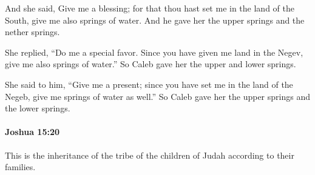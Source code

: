 			\begin{versebox}
					\item[BHS] 
					\item[ASV] And she said, Give me a blessing; for that thou hast set me in the land of the South, give me also springs of water. And he gave her the upper springs and the nether springs.
					\item[NIV] She replied, “Do me a special favor. Since you have given me land in the Negev, give me also springs of water.” So Caleb gave her the upper and lower springs.
					\item[NRSV] She said to him, “Give me a present; since you have set me in the land of the Negeb, give me springs of water as well.” So Caleb gave her the upper springs and the lower springs.
			\end{versebox}

		\paragraph{Joshua 15:20} %
			\label{JOSHUA-15-20}

			This is the inheritance of the tribe of the children of Judah according to their families.

